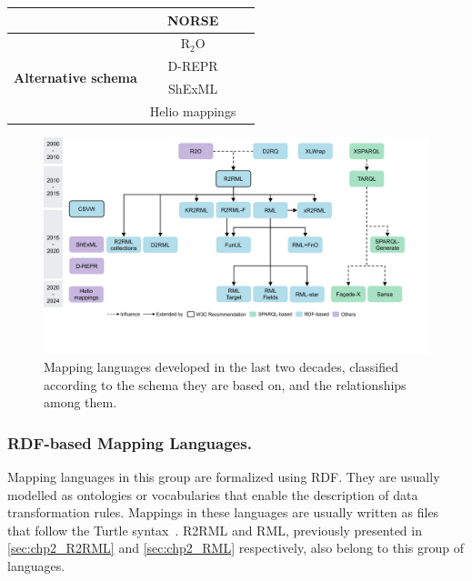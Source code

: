 \begin{table}[t]
{\begin{tabular}{ccc}
                              & NORSE            & \parencite{stadler2023spark}\\ \midrule
\multirow{4}{*}{\textbf{Alternative schema}}       & R$_2$O          & \parencite{barrasa2004r2o}\\ %
                              & D-REPR          & \parencite{Vu2019d-repr}\\ %
                              & ShExML          & \parencite{Garcia-Gonzalez2020shexml,shexml}\\ %
                              & Helio mappings  & \parencite{cimmino2022helio}\\ 
                              \bottomrule
\end{tabular}}
\end{table}



\begin{figure}[t]
\centering
\includegraphics[width=1\linewidth]{figures/chp2_mapping_languages}
\caption[Existing mapping languages and the relationships among them]{Mapping languages developed in the last two decades, classified according to the schema they are based on, and the relationships among them.}
\label{fig:chp2_mapping_languages}
\end{figure}




\subsubsection{RDF-based Mapping Languages.} 
\label{sec:chp2_RDF-languages}

Mapping languages in this group are formalized using RDF. They are usually modelled as ontologies or vocabularies that enable the description of data transformation rules. Mappings in these languages are usually written as files that follow the Turtle syntax~\parencite{turtle}. R2RML and RML, previously presented in \cref{sec:chp2_R2RML}
and \cref{sec:chp2_RML} respectively, also belong to this group of languages. 


